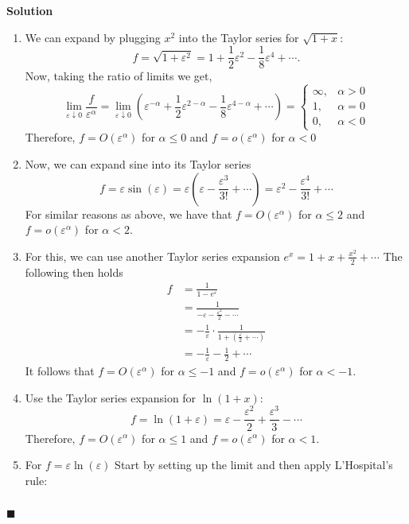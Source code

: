 \documentclass[11pt]{article}
\newcommand{\vep}{\varepsilon}
\theoremstyle{problemstyle}
\newenvironment{solution}
  {\noindent\textbf{Solution}\quad}
  {\hfill$\blacksquare$\par\vspace{1em}}
\begin{document}
\begin{solution}
  \begin{enumerate}[label=(\roman*)]
    \item We can expand by plugging $x^2$ into the Taylor series for $\sqrt{1+x}$:
      \[ f = \sqrt{1 + \vep^2} = 1 + \frac{1}{2}\vep^2 - \frac{1}{8}\vep^4 + \cdots. \]
      Now, taking the ratio of limits we get,
      \[ \lim_{\vep \downarrow 0} \frac{f}{\vep^\alpha} = \lim_{\vep \downarrow 0}
        \left(\vep^{-\alpha} + \frac{1}{2}\vep^{2-\alpha} - \frac{1}{8}\vep^{4-\alpha} + \cdots \right) =
        \begin{cases}
          \infty, & \alpha > 0 \\
          1 , & \alpha = 0 \\
          0 , & \alpha < 0 
        \end{cases}\]
      Therefore, $f = O(\vep^\alpha)$ for $\alpha \leq 0$ and $f = o(\vep^\alpha)$ for $\alpha < 0$
    \item Now, we can expand sine into its Taylor series
      \[ f = \vep \sin(\vep) = \vep \left( \vep - \frac{\vep^3}{3!} + \cdots \right) = \vep^2 -
      \frac{\vep^4}{3!} + \cdots \]
      For similar reasons as above, we have that $f = O(\vep^\alpha)$ for $\alpha \leq 2$
      and $f = o(\vep^\alpha)$ for $\alpha < 2$.
    \item For this, we can use another Taylor series expansion $e^x = 1 + x + \frac{x^2}{2} + \cdots$
      The following then holds
      \begin{align*}
        f & = \frac{1}{1 - e^\vep} \\
          & = \frac{1}{-\vep - \frac{\vep^2}{2} - \cdots} \\
          & = -\frac{1}{\vep} \cdot \frac{1}{1 + \left( \frac{\vep}{2} + \cdots \right)} \\
          & = -\frac{1}{\vep}  - \frac{1}{2} + \cdots
      \end{align*}
      It follows that $f = O(\vep^\alpha)$ for $\alpha \leq -1$
      and $f = o(\vep^\alpha)$ for $\alpha < -1$.
    \item Use the Taylor series expansion for $\ln(1+x)$:
      \[ f = \ln(1 + \vep) = \vep - \frac{\vep^2}{2} + \frac{\vep^3}{3} - \cdots \]
      Therefore, $f = O(\vep^\alpha)$ for $\alpha \leq 1$ and $f = o(\vep^\alpha)$ for $\alpha < 1$.
    \item For $f = \vep \ln(\vep)$ 
      Start by setting up the limit and then apply L'Hospital's rule:
      \begin{align*}

\end{align*}
\end{enumerate}
\end{solution}
\end{document}
